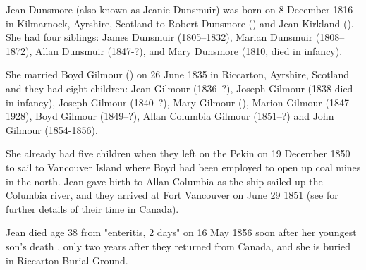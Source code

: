 
Jean Dunsmore (also known as Jeanie Dunsmuir) was born on 8 December 1816 in Kilmarnock, Ayrshire, Scotland to Robert Dunsmore () and Jean Kirkland ().  She had four siblings:  James Dunsmuir (1805--1832), Marian Dunsmuir (1808--1872), Allan Dunsmuir (1847-?),  and Mary Dunsmore (1810, died in infancy).

She married Boyd Gilmour () on 26 June 1835  in Riccarton, Ayrshire, Scotland \cite{JeanDunsmoreMarraige} and they had eight children:  Jean Gilmour (1836--?), Joseph Gilmour (1838-died in infancy), Joseph Gilmour (1840--?), Mary Gilmour (), Marion Gilmour (1847--1928), Boyd Gilmour (1849--?), Allan Columbia Gilmour (1851--?) and John Gilmour (1854-1856).

She already had five children when they left on the Pekin on 19 December 1850 to sail to Vancouver Island where Boyd had been employed to open up coal mines in the north. Jean gave birth to Allan Columbia as the ship sailed up the Columbia river, and they arrived at Fort Vancouver on June 29 1851 (see  for further details of their time in Canada).  

Jean died age 38 from "enteritis, 2 days"  on 16 May 1856 soon after her youngest son's death \cite{JeanDunsmuirDeath}, only two years after they returned from Canada, and she is buried in Riccarton Burial Ground.
